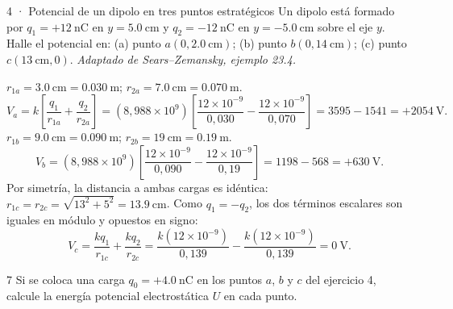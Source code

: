 \documentclass[11pt]{article}
\begin{document}
\begin{eResuelto}{4 · Potencial de un dipolo en tres puntos estratégicos}
Un dipolo está formado por $q_1=+\SI{12}{\nano\coulomb}$ en $y=\SI{5,0}{\centi\metre}$ y $q_2=-\SI{12}{\nano\coulomb}$ en $y=-\SI{5,0}{\centi\metre}$ sobre el eje $y$. Halle el potencial en: (a) punto $a(0,\SI{2,0}{\centi\metre})$; (b) punto $b(0,\SI{14}{\centi\metre})$; (c) punto $c(\SI{13}{\centi\metre},0)$. \emph{Adaptado de Sears--Zemansky, ejemplo 23.4.}
\begin{center}
\end{center}
$r_{1a}=\SI{3,0}{\centi\metre}=\SI{0,030}{\metre}$; $r_{2a}=\SI{7,0}{\centi\metre}=\SI{0,070}{\metre}$.
\[ V_a = k\left[\frac{q_1}{r_{1a}} + \frac{q_2}{r_{2a}}\right] = (8{,}988\times10^9)\left[\frac{12\times10^{-9}}{0{,}030} - \frac{12\times10^{-9}}{0{,}070}\right] = 3595 - 1541 = +\SI{2054}{\volt}. \]
$r_{1b}=\SI{9,0}{\centi\metre}=\SI{0,090}{\metre}$; $r_{2b}=\SI{19}{\centi\metre}=\SI{0,19}{\metre}$.
\[ V_b = (8{,}988\times10^9)\left[\frac{12\times10^{-9}}{0{,}090} - \frac{12\times10^{-9}}{0{,}19}\right] = 1198 - 568 = +\SI{630}{\volt}. \]
Por simetría, la distancia a ambas cargas es idéntica: $r_{1c}=r_{2c}=\sqrt{13^2+5^2}=\SI{13,9}{\centi\metre}$.
Como $q_1=-q_2$, los dos términos escalares son iguales en módulo y opuestos en signo:
\[ V_c = \frac{kq_1}{r_{1c}} + \frac{kq_2}{r_{2c}} = \frac{k(12\times10^{-9})}{0{,}139} - \frac{k(12\times10^{-9})}{0{,}139} = \SI{0}{\volt}. \]
\end{eResuelto}

\begin{eReto}{7 }
Si se coloca una carga $q_0=+\SI{4,0}{\nano\coulomb}$ en los puntos $a$, $b$ y $c$ del ejercicio 4, calcule la energía potencial electrostática $U$ en cada punto.
\end{eReto}
\end{document}
